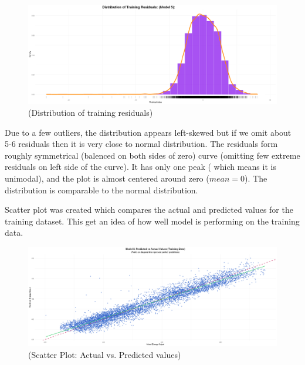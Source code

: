 \documentclass[12pt,a4paper]{article}
\begin{document}
\begin{figure}[H]
  \centering
  \includegraphics[width=\textwidth]{y16.png}
  \caption{(Distribution of training residuals)}
  \label{fig:Model Selection}
\end{figure}

Due to a few outliers, the distribution appears left-skewed 
but if we omit about 5-6 residuals 
then it is very close to normal distribution.
The residuals form roughly symmetrical (balenced on both sides of zero) curve (omitting few extreme residuals on left side of the curve). 
It has only one peak ( which means it is unimodal), and the plot is almost centered around 
zero ($mean= 0$). The distribution is comparable to the normal distribution. 


Scatter plot was created which compares the actual and 
predicted values for the training dataset. 
This get an idea of how well model is performing on the training data. 


\begin{figure}[H]
  \centering
  \includegraphics[width=\textwidth]{y17.png}
  \caption{(Scatter Plot: Actual vs. Predicted values)}
  \label{fig:actual vs. predicted values for train dataset}
\end{figure}
\end{document}
